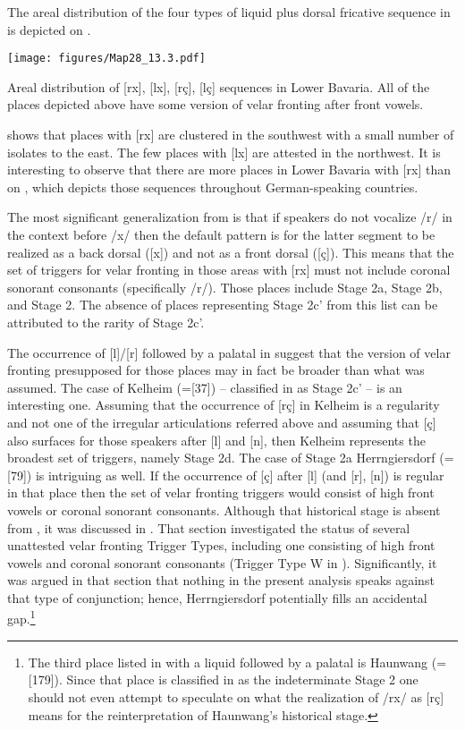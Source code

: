The areal distribution of the four types of liquid plus dorsal fricative sequence in  is depicted on .

\begin{map}
\texttt{[image: figures/Map28\_13.3.pdf]}
\caption[Areal distribution of {[rx]}, {[lx]}, {[rç]}, {[lç]} sequences in Lower Bavaria]{Areal distribution of [rx], [lx], [rç], [lç] sequences in Lower Bavaria. All of the places depicted above have some version of velar fronting after front vowels.}\label{map:28}
\end{map}

 shows that places with [rx] are clustered in the southwest with a small number of isolates to the east. The few places with [lx] are attested in the northwest. It is interesting to observe that there are more places in Lower Bavaria with [rx] than on , which depicts those sequences throughout German-speaking countries.

The most significant generalization from  is that if speakers do not vocalize /r/ in the context before /x/ then the default pattern is for the latter segment to be realized as a back dorsal ([x]) and not as a front dorsal ([ç]). This means that the set of triggers for velar fronting in those areas with [rx] must not include coronal sonorant consonants (specifically /r/). Those places include Stage 2a, Stage 2b, and Stage 2. The absence of places representing Stage 2c' from this list can be attributed to the rarity of Stage 2c'.

The occurrence of [l]/[r] followed by a palatal in  suggest that the version of velar fronting presupposed for those places may in fact be broader than what was assumed. The case of Kelheim (=[37]) -- classified in  as Stage 2c' -- is an interesting one. Assuming that the occurrence of [rç] in Kelheim is a regularity and not one of the irregular articulations referred above and assuming that [ç] also surfaces for those speakers after [l] and [n], then Kelheim represents the broadest set of triggers, namely Stage 2d. The case of Stage 2a Herrngiersdorf (=[79]) is intriguing as well. If the occurrence of [ç] after [l] (and [r], [n]) is regular in that place then the set of velar fronting triggers would consist of high front vowels or coronal sonorant consonants. Although that historical stage is absent from , it was discussed in . That section investigated the status of several unattested velar fronting Trigger Types, including one consisting of high front vowels and coronal sonorant consonants (Trigger Type W in ). Significantly, it was argued in that section that nothing in the present analysis speaks against that type of conjunction; hence, Herrngiersdorf potentially fills an accidental gap.\footnote{{The third place listed in  with a liquid followed by a palatal is Haunwang (=[179]). Since that place is classified in  as the indeterminate Stage 2 one should not even attempt to speculate on what the realization of /rx/ as [rç] means for the reinterpretation of Haunwang’s historical stage.}}


